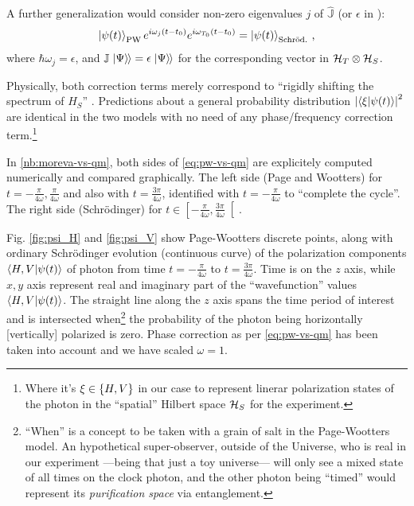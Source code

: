 A further generalization would consider non-zero eigenvalues $j$ of $\hat{\mathbb{J}}$
(or $\epsilon$ in \cite[eq. 16]{Lloyd:Time}):
\begin{equation}\label{eq:pw-vs-qm}
  \ket{\psi(t)}_{\mathrm{PW}} e^{i\omega_{j}(t - t_{0})} e^{i\omega_{T_0}(t - t_{0})} = \ket{\psi(t)}_{\mathrm{Schr\ddot{o}d.}} \,\text{,}
\end{equation}
where $\hbar\omega_j = \epsilon$,
and $\mathbb{J}\left.\left| \Psi \right\rangle\hspace{-0.115em}\right\rangle = \epsilon \left.\left| \Psi \right\rangle\hspace{-0.115em}\right\rangle$
for the corresponding vector in $\mathcal{H}_T \otimes \mathcal{H}_S$.

Physically, both correction terms merely
correspond to ``rigidly shifting the spectrum of $H_S$'' \parencite{Lloyd:Time}.
Predictions about a general probability distribution
$\abs{\braket{\xi}{\psi(t)}}^2$
are identical in the two models with no need of any phase/frequency correction term.\footnote{
  Where it's $\xi \in \qty{H, V}$
  in our case to represent linerar polarization states of the photon in
  the ``spatial'' Hilbert space $\mathcal{H}_S$
  for the experiment.
}

\begin{spacing}{1.5}
  In \ref{nb:moreva-vs-qm},
  both sides of \eqref{eq:pw-vs-qm} are
  explicitely computed numerically and compared graphically.
  The left side (Page and Wootters)
  for $t = -\frac{\pi}{4\omega}, \frac{\pi}{4\omega}$ and also with
  $t = \frac{3\pi}{4\omega}$, identified with $t = -\frac{\pi}{4\omega}$
  to ``complete the cycle''.
  The right side (Schr{\"o}dinger) for
  $t \in \left[-\frac{\pi}{4\omega}, \frac{3\pi}{4\omega}\right[$.
\end{spacing}

Fig. \ref{fig:psi_H} and \ref{fig:psi_V} show
Page-Wootters discrete points, along with
ordinary Schr{\"o}dinger evolution (continuous curve)
of the polarization components
$\braket{H,V}{\psi(t)}$ of photon
from time $t = -\frac{\pi}{4\omega}$
to $t = \frac{3\pi}{4\omega}$. Time is on the $z$ axis,
while $x, y$ axis represent real and imaginary part of
the ``wavefunction'' values $\braket{H,V}{\psi(t)}$.
The straight line along the $z$ axis
spans the time period of interest
and is intersected when\footnote{
  ``When'' is a concept to be taken with a grain of salt in the Page-Wootters model.
  An hypothetical super-observer, outside of the Universe,
  who is real in our experiment ---being that just a toy universe---
  will only see a mixed state of all times on the clock photon, and the other
  photon being ``timed'' would represent its \emph{purification space}
  via entanglement.
}
the probability of the photon being
horizontally [vertically] polarized is zero.
Phase correction as per \eqref{eq:pw-vs-qm} has been taken into account
and we have scaled $\omega=1$.

